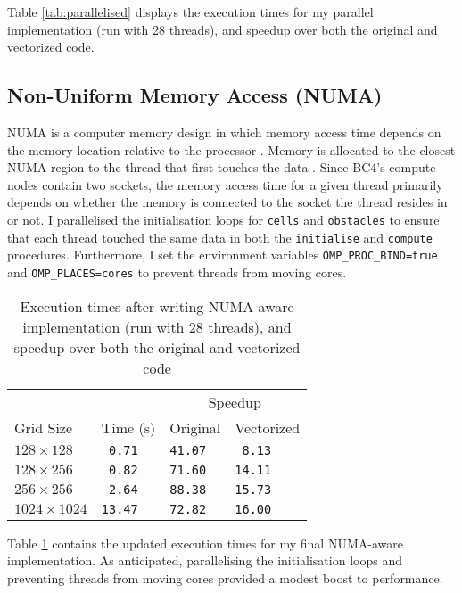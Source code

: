 \documentclass[11pt, twocolumn, a4paper]{article}
\begin{document}
Table \ref{tab:parallelised} displays the execution times for my parallel implementation (run with 28 threads), and speedup over both the original and vectorized code.

\subsection{Non-Uniform Memory Access (NUMA)}

NUMA is a computer memory design in which memory access time depends on the memory location relative to the processor \cite{numa}.
Memory is allocated to the closest NUMA region to the thread that first touches the data \cite{numa_bristol}.
Since BC4's compute nodes contain two sockets, the memory access time for a given thread primarily depends on whether the memory is connected to the socket the thread resides in or not.
I parallelised the initialisation loops for \texttt{cells} and \texttt{obstacles} to ensure that each thread touched the same data in both the \texttt{initialise} and \texttt{compute} procedures.
Furthermore, I set the environment variables \texttt{OMP\_PROC\_BIND=true} and \texttt{OMP\_PLACES=cores} to prevent threads from moving cores.

\begin{table}[htbp]
  \begin{center}
  \caption{Execution times after writing NUMA-aware implementation (run with 28 threads), and speedup over both the original and vectorized code}\label{tab:numa}
  \begin{tabular}{l | l  l  l} 
      \hline\hline
      &&\multicolumn{2}{c}{Speedup}\\
      \cline{3-4}
      Grid Size&Time (s)&Original&Vectorized\\
      \hline
      $128 \times 128$&\texttt{ 0.71}&\texttt{41.07}&\texttt{ 8.13}\\
      $128 \times 256$&\texttt{ 0.82}&\texttt{71.60}&\texttt{14.11}\\
      $256 \times 256$&\texttt{ 2.64}&\texttt{88.38}&\texttt{15.73}\\
      $1024 \times 1024$&\texttt{13.47}&\texttt{72.82}&\texttt{16.00}\\
      \hline
    \end{tabular}
  \end{center}
\end{table}

Table \ref{tab:numa} contains the updated execution times for my final NUMA-aware implementation.
As anticipated, parallelising the initialisation loops and preventing threads from moving cores provided a modest boost to performance.
\end{document}
